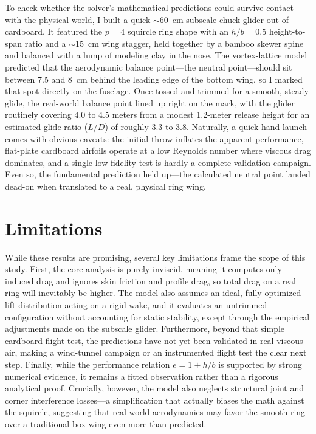 \documentclass[11pt]{article}
\begin{document}
To check whether the solver's mathematical predictions could survive
contact with the physical world, I built a quick $\sim$60~cm subscale chuck
glider out of cardboard. It featured the $p=4$ squircle ring shape with an
$h/b = 0.5$ height-to-span ratio and a $\sim$15~cm wing stagger, held
together by a bamboo skewer spine and balanced with a lump of modeling clay
in the nose. The vortex-lattice model predicted that the aerodynamic
balance point---the neutral point---should sit between 7.5 and 8~cm behind
the leading edge of the bottom wing, so I marked that spot directly on the
fuselage. Once tossed and trimmed for a smooth, steady glide, the real-world
balance point lined up right on the mark, with the glider routinely covering
4.0 to 4.5 meters from a modest 1.2-meter release height for an estimated
glide ratio ($L/D$) of roughly 3.3 to 3.8. Naturally, a quick hand launch
comes with obvious caveats: the initial throw inflates the apparent
performance, flat-plate cardboard airfoils operate at a low Reynolds number
where viscous drag dominates, and a single low-fidelity test is hardly a
complete validation campaign. Even so, the fundamental prediction held
up---the calculated neutral point landed dead-on when translated to a real,
physical ring wing.

\section{Limitations}

While these results are promising, several key limitations frame the scope
of this study. First, the core analysis is purely inviscid, meaning it
computes only induced drag and ignores skin friction and profile drag, so
total drag on a real ring will inevitably be higher. The model also assumes
an ideal, fully optimized lift distribution acting on a rigid wake, and it
evaluates an untrimmed configuration without accounting for static
stability, except through the empirical adjustments made on the subscale
glider. Furthermore, beyond that simple cardboard flight test, the
predictions have not yet been validated in real viscous air, making a
wind-tunnel campaign or an instrumented flight test the clear next step.
Finally, while the performance relation $e = 1 + h/b$ is supported by strong
numerical evidence, it remains a fitted observation rather than a rigorous
analytical proof. Crucially, however, the model also neglects structural
joint and corner interference losses---a simplification that actually biases
the math against the squircle, suggesting that real-world aerodynamics may
favor the smooth ring over a traditional box wing even more than predicted.
\end{document}
